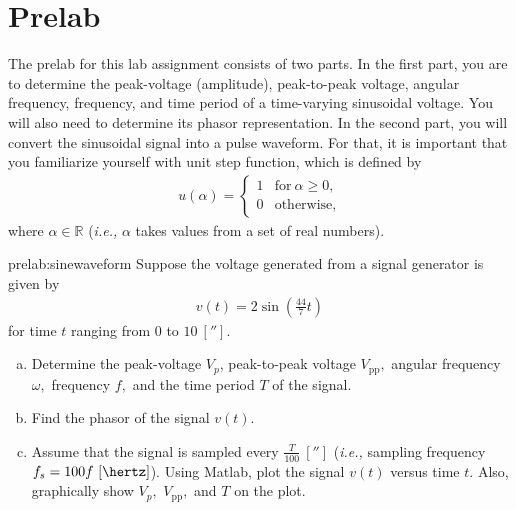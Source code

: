 


\section{Prelab}
\label{sec:prelab}

The prelab for this lab assignment consists of two parts. In the first part, you are to determine the peak-voltage (amplitude), peak-to-peak voltage, angular frequency, frequency, and time period of a time-varying sinusoidal voltage. You will also need to determine its phasor representation. In the second part, you will convert the sinusoidal signal into a pulse waveform. For that, it is important that you familiarize yourself with unit step function, which is defined by %
  \begin{align}
    u(\alpha) =
    \begin{cases}
      1 & \text{for}~\alpha\ge 0,\\
      0 & \text{otherwise,}
    \end{cases}
    \label{eq:uAlpha}
  \end{align}
  where $\alpha\in\mathbb{R}$ (\textit{i.e.,} $\alpha$ takes values from a set of real numbers). 

\begin{prelab}{prelab:sinewaveform}
  Suppose the voltage generated from a signal generator is given by %
  \begin{align*}
    v(t) = 2\sin\left(\frac{44}{7}t\right) 
  \end{align*}
  for time $t$ ranging from $0$ to $10~[\second].$ 
  \begin{enumerate}[(a)]
      \item Determine the peak-voltage $V_p$, peak-to-peak voltage $V_{\text{pp}},$ angular frequency $\omega,$ frequency  $f,$ and the time period $T$  of the signal.
      
      \item Find the phasor of the signal $v(t).$
      \item Assume that the signal is sampled every $\frac{T}{100}~[\second]$ (\textit{i.e.,} sampling frequency $f_s = 100f~[\hertz]$). Using Matlab, plot the signal $v(t)$ versus time $t.$  Also, graphically show $V_p,$ $V_{\text{pp}},$ and $T$ on the plot.  
      
      
  \end{enumerate}
  
\end{prelab}

